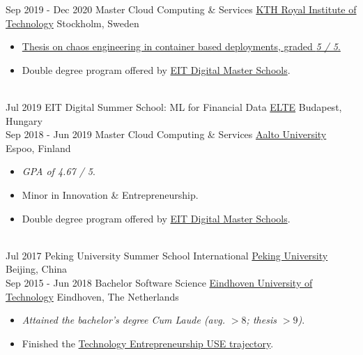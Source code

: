 \documentclass[a4paper]{twentysecondcv} %
\begin{document}
\begin{twenty} %
    \twentyitem
    	{Sep 2019 - }
        {Dec 2020}
        {Master Cloud Computing \& Services}
        {\href{https://kth.se/en}{KTH Royal Institute of Technology}}
        {Stockholm, Sweden}
        {
        \begin{itemize}
            \item \href{https://urn.kb.se/resolve?urn=urn:nbn:se:kth:diva-291281}{Thesis on chaos engineering in container based deployments, graded \emph{5 / 5}.}
            \item Double degree program offered by \href{https://masterschool.eitdigital.eu/}{EIT Digital Master Schools}.
        \end{itemize}
        }
    \\
	\twentyitem
    	{Jul 2019}
		{}
        {EIT Digital Summer School: ML for Financial Data}
        {\href{https://www.elte.hu/en/}{ELTE}}
        {Budapest, Hungary}
        {
    	}
    \\
	\twentyitem
    	{Sep 2018 - }
        {Jun 2019}
        {Master Cloud Computing \& Services}
        {\href{https://www.aalto.fi/en}{Aalto University}}
        {Espoo, Finland}
        {
        \begin{itemize}
            \item \emph{GPA of 4.67 / 5}.
            \item Minor in Innovation \& Entrepreneurship.
            \item Double degree program offered by \href{https://masterschool.eitdigital.eu/}{EIT Digital Master Schools}.
        \end{itemize}
        }
    \\
	\twentyitem
    	{Jul 2017}
		{}
        {Peking University Summer School International}
        {\href{http://www.oir.pku.edu.cn/summerschool/}{Peking University}}
        {Beijing, China}
        {
    	}
    \\
    \twentyitem
    	{Sep 2015 - }
        {Jun 2018}
        {Bachelor Software Science}
        {\href{https://tue.nl/}{Eindhoven University of Technology}}
        {Eindhoven, The Netherlands}
        {
       	\begin{itemize}
   			\item \emph{Attained the bachelor's degree Cum Laude (avg. $> 8$; thesis $> 9$)}.
            \item Finished the \href{https://educationguide.tue.nl/programs/bachelor-college/use-learning-trajectory/technology-entrepreneurship/}{Technology Entrepreneurship USE trajectory}.
		\end{itemize}
    	}
\end{twenty}
\end{document}
